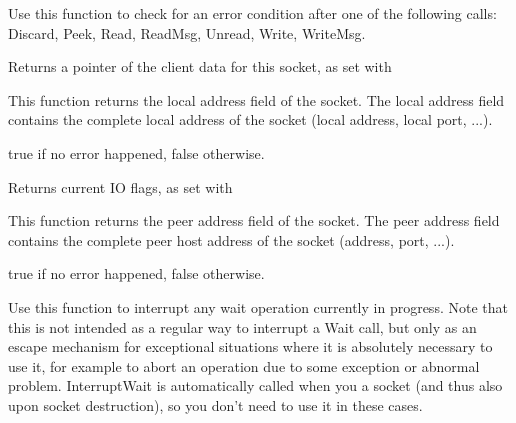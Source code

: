 Use this function to check for an error condition after one of the
following calls: Discard, Peek, Read, ReadMsg, Unread, Write, WriteMsg.

%
%
\label{wxsocketbasegetclientdata}


Returns a pointer of the client data for this socket, as set with 

%
%
\label{wxsocketbasegetlocal}


This function returns the local address field of the socket. The local
address field contains the complete local address of the socket (local
address, local port, ...).


true if no error happened, false otherwise.

%
%
\label{wxsocketbasegetflags}


Returns current IO flags, as set with 

%
%
\label{wxsocketbasegetpeer}


This function returns the peer address field of the socket. The peer 
address field contains the complete peer host address of the socket
(address, port, ...).


true if no error happened, false otherwise.

%
%
\label{wxsocketbaseinterruptwait}


Use this function to interrupt any wait operation currently in progress.
Note that this is not intended as a regular way to interrupt a Wait call,
but only as an escape mechanism for exceptional situations where it is
absolutely necessary to use it, for example to abort an operation due to
some exception or abnormal problem. InterruptWait is automatically called
when you  a socket (and thus also upon
socket destruction), so you don't need to use it in these cases.

